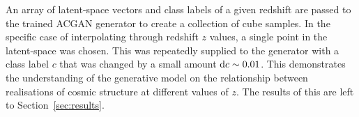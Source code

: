 \documentclass[twocolumn]{article}
\numberwithin{equation}{section}
\begin{document}
An array of latent-space vectors and class labels of a given redshift are passed to the trained ACGAN generator to create
a collection of cube samples. 
In the specific case of interpolating through redshift $z$ values, a single point in the latent-space was chosen. This was 
repeatedly supplied to the generator with a class label $c$ that was changed by a small amount $\textup{d}c \sim 0.01$. 
This demonstrates the understanding of the generative model on the relationship between realisations of cosmic structure 
at different values of $z$. The results of this are left to Section~\ref{sec:results}.



\end{document}
